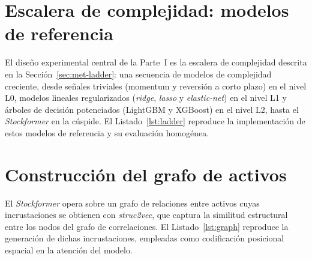 \section{Escalera de complejidad: modelos de referencia}\label{sec:cod-ladder}

El diseño experimental central de la Parte~I es la escalera de complejidad descrita en
la Sección~\ref{sec:met-ladder}: una secuencia de modelos de complejidad creciente, desde
señales triviales (momentum y reversión a corto plazo) en el nivel L0, modelos lineales
regularizados (\emph{ridge}, \emph{lasso} y \emph{elastic-net}) en el nivel L1 y
árboles de decisión potenciados (LightGBM y XGBoost) en el nivel L2, hasta el
\emph{Stockformer} en la cúspide. El Listado~\ref{lst:ladder} reproduce la
implementación de estos modelos de referencia y su evaluación homogénea.



\section{Construcción del grafo de activos}\label{sec:cod-graph}

El \emph{Stockformer} opera sobre un grafo de relaciones entre activos cuyas
incrustaciones se obtienen con \emph{struc2vec}, que captura la similitud estructural
entre los nodos del grafo de correlaciones. El Listado~\ref{lst:graph} reproduce la
generación de dichas incrustaciones, empleadas como codificación posicional espacial en
la atención del modelo.


